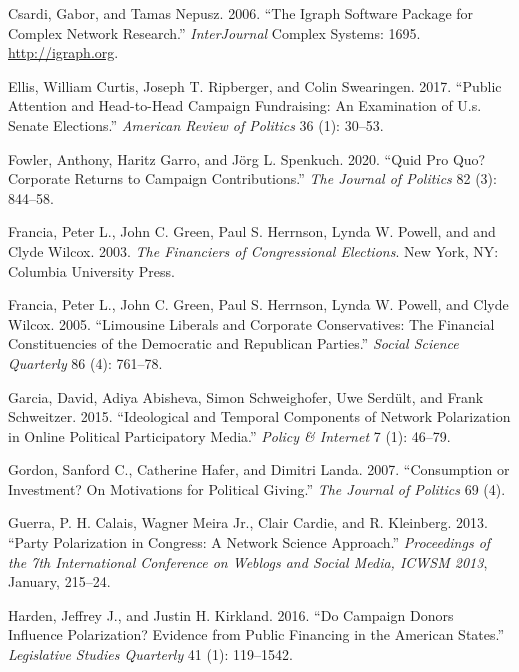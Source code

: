 \documentclass[12pt,]{article}
\begin{document}
\leavevmode\hypertarget{ref-igraph}{}%
Csardi, Gabor, and Tamas Nepusz. 2006. ``The Igraph Software Package for
Complex Network Research.'' \emph{InterJournal} Complex Systems: 1695.
\url{http://igraph.org}.

\leavevmode\hypertarget{ref-ellis2017}{}%
Ellis, William Curtis, Joseph T. Ripberger, and Colin Swearingen. 2017.
``Public Attention and Head-to-Head Campaign Fundraising: An Examination
of U.s. Senate Elections.'' \emph{American Review of Politics} 36 (1):
30--53.

\leavevmode\hypertarget{ref-garro2020}{}%
Fowler, Anthony, Haritz Garro, and Jörg L. Spenkuch. 2020. ``Quid Pro
Quo? Corporate Returns to Campaign Contributions.'' \emph{The Journal of
Politics} 82 (3): 844--58.

\leavevmode\hypertarget{ref-francia2003}{}%
Francia, Peter L., John C. Green, Paul S. Herrnson, Lynda W. Powell, and
and Clyde Wilcox. 2003. \emph{The Financiers of Congressional
Elections}. New York, NY: Columbia University Press.

\leavevmode\hypertarget{ref-francia2005}{}%
Francia, Peter L., John C. Green, Paul S. Herrnson, Lynda W. Powell, and
Clyde Wilcox. 2005. ``Limousine Liberals and Corporate Conservatives:
The Financial Constituencies of the Democratic and Republican Parties.''
\emph{Social Science Quarterly} 86 (4): 761--78.

\leavevmode\hypertarget{ref-garcia2015}{}%
Garcia, David, Adiya Abisheva, Simon Schweighofer, Uwe Serdült, and
Frank Schweitzer. 2015. ``Ideological and Temporal Components of Network
Polarization in Online Political Participatory Media.'' \emph{Policy \&
Internet} 7 (1): 46--79.

\leavevmode\hypertarget{ref-gordon2007}{}%
Gordon, Sanford C., Catherine Hafer, and Dimitri Landa. 2007.
``Consumption or Investment? On Motivations for Political Giving.''
\emph{The Journal of Politics} 69 (4).

\leavevmode\hypertarget{ref-guerra2013}{}%
Guerra, P. H. Calais, Wagner Meira Jr., Clair Cardie, and R. Kleinberg.
2013. ``Party Polarization in Congress: A Network Science Approach.''
\emph{Proceedings of the 7th International Conference on Weblogs and
Social Media, ICWSM 2013}, January, 215--24.

\leavevmode\hypertarget{ref-harden2016}{}%
Harden, Jeffrey J., and Justin H. Kirkland. 2016. ``Do Campaign Donors
Influence Polarization? Evidence from Public Financing in the American
States.'' \emph{Legislative Studies Quarterly} 41 (1): 119--1542.
\end{document}
